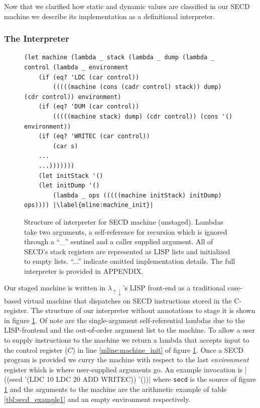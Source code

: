 \documentclass{article}
\theoremstyle{definition}
\newcommand{\mslang}{$\lambda_{\uparrow\downarrow}$}
\begin{document}
Now that we clarified how static and dynamic values are classified in our SECD machine we describe its implementation as a definitional interpreter.


\subsubsection{The Interpreter}\label{subsec:secd_interp}
\begin{figure}[ht]
\centering
\begin{verbatim}
(let machine (lambda _ stack (lambda _ dump (lambda _ control (lambda _ environment
    (if (eq? 'LDC (car control))
        (((((machine (cons (cadr control) stack)) dump) (cdr control)) environment)
    (if (eq? 'DUM (car control))
        (((((machine stack) dump) (cdr control)) (cons '() environment))
    (if (eq? 'WRITEC (car control))
        (car s)
    ...
    ...)))))))
    (let initStack '()
    (let initDump '()
        (lambda _ ops (((((machine initStack) initDump) ops)))) |\label{mline:machine_init}|
\end{verbatim}
\caption{Structure of interpreter for SECD machine (unstaged). Lambdas take two arguments, a self-reference for recursion which is ignored through a ``\_'' sentinel and a caller supplied argument. All of SECD's stack registers are represented as LISP lists and initialized to empty lists. ``...'' indicate omitted implementation details. The full interpreter is provided in APPENDIX.}
\label{lst:secd_unstaged}
\end{figure}

Our staged machine is written in \mslang's LISP front-end as a traditional case-based virtual machine that dispatches on SECD instructions stored in the C-register. The structure of our interpreter without annotations to stage it is shown in figure \ref{lst:secd_unstaged}. Of note are the single-argument self-referential lambdas due to the LISP-frontend and the out-of-order argument list to the machine. To allow a user to supply instructions to the machine we return a lambda that accepts input to the control register ($C$) in line \ref{mline:machine_init} of figure \ref{lst:secd_unstaged}. Once a SECD program is provided we curry the machine with respect to the last \textit{environment} register which is where user-supplied arguments go. An example invocation is |((secd '(LDC 10 LDC 20 ADD WRITEC)) '())| where \texttt{secd} is the source of figure \ref{lst:secd_unstaged} and the arguments to the machine are the arithmetic example of table \ref{tbl:secd_example1} and an empty environment respectively.
\end{document}
